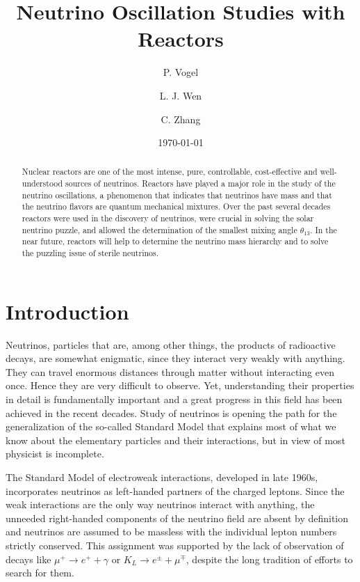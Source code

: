 \documentclass[aps,twocolumn,preprintnumbers,amsmath,superscriptaddress,amssymb,floats,nofootinbib]{revtex4-1}
\begin{document}
\title{Neutrino Oscillation Studies with Reactors}
\date{\today}
\author{P. Vogel}
\author{L. J. Wen}
\author{C. Zhang}


\begin{abstract}
Nuclear reactors are one of the most intense, pure, controllable, cost-effective and well-understood sources of neutrinos. Reactors have played a major role in the study of the neutrino oscillations, a phenomenon that indicates that neutrinos have mass and that the neutrino flavors are quantum mechanical mixtures. Over the past several decades reactors were used in the discovery of neutrinos, were crucial in solving the solar neutrino puzzle, and allowed the determination of the smallest mixing angle $\theta_{13}$. In the near future, reactors will help to determine the neutrino mass hierarchy and to solve the puzzling issue of sterile neutrinos.
\end{abstract}

\maketitle
\thispagestyle{plain}

\section{Introduction} 
\label{sec:intro}
Neutrinos, particles that are, among other things, the products of  radioactive decays, are somewhat enigmatic, since they interact very weakly with anything. 
They can travel enormous distances through matter without interacting even once. 
Hence they are very difficult to observe. 
Yet, understanding their properties in detail is fundamentally important and a great progress in this field has been achieved in the recent decades.   
Study of neutrinos is opening the path for the generalization of the so-called Standard Model that explains most of what we know about the elementary particles and their interactions, but in view of most physicist is incomplete.

The Standard Model of electroweak interactions,
developed in late 1960s, incorporates neutrinos as left-handed partners of the charged leptons. Since the weak interactions are the
only way neutrinos interact with anything, the unneeded right-handed components of the neutrino field are absent 
by definition and neutrinos are assumed to be massless with the individual lepton numbers strictly conserved.
This assignment was supported by the lack of observation of decays like 
$\mu^+ \rightarrow e^+ + \gamma$ or $K_L \rightarrow e^{\pm} + \mu^{\mp}$,
despite the long tradition of efforts to search for them.
\end{document}
